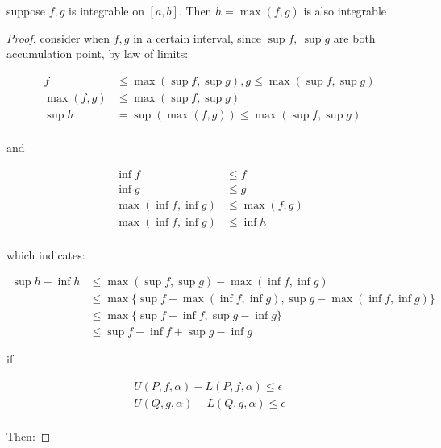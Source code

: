 \begin{thm}
    suppose $f,g$ is integrable on $[a,b]$. Then $h = \max(f,g)$ is also integrable
\end{thm}

\begin{proof}
    consider when $f,g$ in a certain interval, since $\sup f,\: \sup g$ are both accumulation point, 
    by law of limits:
    
    \begin{align*}
        f &\le \max(\sup f, \sup g), g \le \max(\sup f, \sup g) \\
        \max(f,g) &\le \max(\sup f, \sup g) \\
        \sup h  & = \sup\left( \max(f,g) \right) \le \max(\sup f, \sup g) \\
    \end{align*}

    and

    \begin{align*}
        \inf f & \le f \\
        \inf g & \le g \\
        \max(\inf f, \inf g) & \le \max (f,g) \\
        \max(\inf f, \inf g) & \le \inf h \\
    \end{align*}

    which indicates:

    \begin{align*}
        \sup h - \inf h & \le \max(\sup f, \sup g) - \max(\inf f, \inf g) \\
        & \le \max \{ \sup f - \max(\inf f, \inf g), \sup g - \max(\inf f, \inf g) \} \\
        & \le \max \{ \sup f - \inf f, \sup g - \inf g \} \\
        & \le \sup f - \inf f +  \sup g - \inf g
    \end{align*}

    if 

    \begin{align*}
        U(P,f,\alpha) - L(P,f,\alpha) \le \epsilon \\
        U(Q,g,\alpha) - L(Q,g,\alpha) \le \epsilon \\
    \end{align*}

    Then:


\end{proof}
